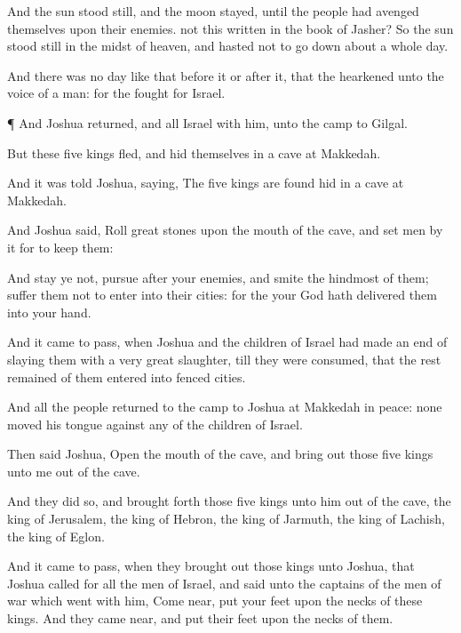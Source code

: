 {And the
sun stood
still, and the
moon
stayed, until the
people had
avenged themselves upon their
enemies.
{} not
this
written in the
book of
Jasher? So the
sun stood
still in the
midst of
heaven, and
hasted not to go
down about a
whole
day.

And there was no
day like that
before it or
after it, that the
{}
hearkened unto the
voice of a
man: for the
{}
fought for
Israel.


\par }{\PP {}¶ And
Joshua
returned, and all
Israel with him, unto the
camp to
Gilgal.

But these
five
kings
fled, and
hid themselves in a
cave at
Makkedah.

And it was
told
Joshua,
saying, The
five
kings are
found
hid in a
cave at
Makkedah.

And
Joshua
said,
Roll
great
stones upon the
mouth of the
cave, and
set
men by it for to
keep them:

And
stay ye not,
{}
pursue
after your
enemies, and smite the
hindmost of them;
suffer them not to
enter into their
cities: for the
{} your
God hath
delivered them into your
hand.

And it came to pass, when
Joshua and the
children of
Israel had made an
end of
slaying them with a
very
great
slaughter, till they were
consumed, that the
rest
{}
remained of them
entered into
fenced
cities.

And all the
people
returned to the
camp to
Joshua at
Makkedah in
peace: none
moved his
tongue against
any of the
children of
Israel.

Then
said
Joshua,
Open the
mouth of the
cave, and bring
out those
five
kings unto me out of the
cave.

And they
did so, and brought
forth those
five
kings unto him out of the
cave, the
king of
Jerusalem, the
king of
Hebron, the
king of
Jarmuth, the
king of
Lachish,
{} the
king of
Eglon.

And it came to pass, when they brought
out those
kings unto
Joshua, that
Joshua
called for all the
men of
Israel, and
said unto the
captains of the
men of
war which
went with him, Come
near,
put your
feet upon the
necks of these
kings. And they came
near, and
put their
feet upon the
necks of them.

}
